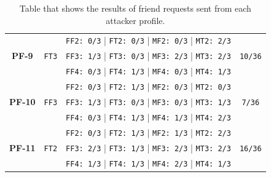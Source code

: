 \begin{table}[H]
\begin{center}
\begin{tabular}[c]{ |c|c|c|c|}
\multirow{3}{*}{\textbf{PF-9}} & \multirow{3}{*}{\texttt{FT3}}
&   \texttt{FF2: 0/3}  |  \texttt{FT2: 0/3}  |  \texttt{MF2: 0/3}  |  \texttt{MT2: 2/3} & \multirow{3}{*}{\texttt{10/36}} \\
& & \texttt{FF3: 1/3}  |  \texttt{FT3: 0/3}  |  \texttt{MF3: 2/3}  |  \texttt{MT3: 2/3} & \\
& & \texttt{FF4: 0/3}  |  \texttt{FT4: 1/3}  |  \texttt{MF4: 0/3}  |  \texttt{MT4: 1/3} & \\
\hline
\multirow{3}{*}{\textbf{PF-10}} & \multirow{3}{*}{\texttt{FF3}}
&   \texttt{FF2: 0/3}  |  \texttt{FT2: 1/3}  |  \texttt{MF2: 0/3}  |  \texttt{MT2: 0/3} & \multirow{3}{*}{\texttt{7/36}} \\
& & \texttt{FF3: 1/3}  |  \texttt{FT3: 0/3}  |  \texttt{MF3: 0/3}  |  \texttt{MT3: 1/3} & \\
& & \texttt{FF4: 0/3}  |  \texttt{FT4: 1/3}  |  \texttt{MF4: 1/3}  |  \texttt{MT4: 2/3} & \\
\hline
\multirow{3}{*}{\textbf{PF-11}} & \multirow{3}{*}{\texttt{FT2}}
&   \texttt{FF2: 0/3}  |  \texttt{FT2: 1/3}  |  \texttt{MF2: 1/3}  |  \texttt{MT2: 2/3} & \multirow{3}{*}{\texttt{16/36}} \\
& & \texttt{FF3: 2/3}  |  \texttt{FT3: 1/3}  |  \texttt{MF3: 2/3}  |  \texttt{MT3: 2/3} & \\
& & \texttt{FF4: 1/3}  |  \texttt{FT4: 1/3}  |  \texttt{MF4: 2/3}  |  \texttt{MT4: 1/3} & \\
\hline			
		\end{tabular}
	\end{center}
	\caption{Table that shows the results of friend requests sent from each attacker profile.}
	\label{table:acceptance-attacker}
\end{table}

